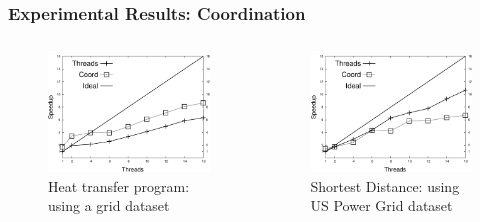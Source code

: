 \documentclass{beamer}
\begin{document}
\begin{frame}[fragile]
   \frametitle{Experimental Results: Coordination}
   \begin{columns}[t]
      \begin{figure}[b]
         \includegraphics[width=\textwidth]{coord/speedup_heat-transfer-80.pdf}
         \caption{Heat transfer program: using a grid dataset}
      \end{figure}
      \begin{figure}[b]
         \includegraphics[width=\textwidth]{coord/speedup_shortest-uspowergrid.pdf}
         \caption{Shortest Distance: using US Power Grid dataset}
      \end{figure}
   \end{columns}
\end{frame}
\end{document}
